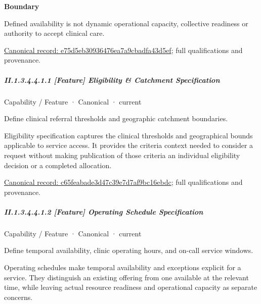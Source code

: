 \textbf{Boundary}



Defined availability is not dynamic operational capacity, collective readiness or authority to accept clinical care.


{\footnotesize \href{../../../../continuum/strategy/capability/e75d5eb30936476ea7a9cbadfa43d5ef.md}{Canonical record: e75d5eb30936476ea7a9cbadfa43d5ef}; full qualifications and provenance.}\par
\subparagraph*{II.1.3.4.4.1.1 [Feature] Eligibility \& Catchment Specification}
\label{navigation:II.1.3.4.4.1.1}

\label{element:c65feabade3d47c39e7d7af9bc16ebdc}
{\small Capability / Feature · Canonical · current}\par

Define clinical referral thresholds and geographic catchment boundaries.



Eligibility specification captures the clinical thresholds and geographical bounds applicable to service access. It provides the criteria context needed to consider a request without making publication of those criteria an individual eligibility decision or a completed allocation.


{\footnotesize \href{../../../../continuum/strategy/capability/feature/c65feabade3d47c39e7d7af9bc16ebdc.md}{Canonical record: c65feabade3d47c39e7d7af9bc16ebdc}; full qualifications and provenance.}\par
\subparagraph*{II.1.3.4.4.1.2 [Feature] Operating Schedule Specification}
\label{navigation:II.1.3.4.4.1.2}

\label{element:4753953665d343c5a97bc4965be3f615}
{\small Capability / Feature · Canonical · current}\par

Define temporal availability, clinic operating hours, and on-call service windows.



Operating schedules make temporal availability and exceptions explicit for a service. They distinguish an existing offering from one available at the relevant time, while leaving actual resource readiness and operational capacity as separate concerns.


